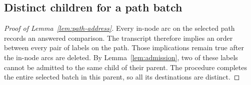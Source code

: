 \subsection{Distinct children for a path batch}\label{sec:path-resolutions}

\begin{proof}[Proof of Lemma~\ref{lem:path-address}]
Every in-node arc on the selected path records an answered comparison.
The transcript therefore implies an order between every pair of labels on
the path. Those implications remain true after the in-node arcs are deleted.
By Lemma~\ref{lem:admission}, two of these labels cannot be admitted to the
same child of their parent. The procedure completes the entire selected
batch in this parent, so all its destinations are distinct.
\end{proof}
